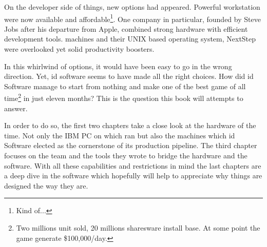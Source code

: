  On the developer side of things, new options had appeared. Powerful workstation were now available and affordable\footnote{Kind of...}. One company in particular, founded by Steve Jobs after his departure from Apple, combined strong hardware with efficient development tools. \NeXT machines and their UNIX based operating system, NextStep were overlooked yet solid productivity boosters.\\
 \par
 In this whirlwind of options, it would have been easy to go in the wrong direction. Yet, id software seems to have made all the right choices. How did id Software manage to start from nothing and make one of the best game of all time\footnote{Two millions unit sold, 20 millions sharesware install base. At some point the game generate \$100,000/day.} in just eleven months? This is the question this book will attempts to answer.\\
 \par
  In order to do so, the first two chapters take a close look at the hardware of the time. Not only the IBM PC on which \doom ran but also the \NeXT machines which id Software elected as the cornerstone of its production pipeline. The third chapter focuses on the team and the tools they wrote to bridge the hardware and the software. With all these capabilities and restrictions in mind the last chapters are a deep dive in the software which hopefully will help to appreciate why things are designed the way they are.\\

\begin{figure}[H]
\centering
{}
\end{figure}
\par
\vspace{15pt}
\par
\begin{figure}[H]
\centering
{}
\end{figure}
